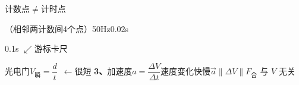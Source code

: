 计数点$\ne$计时点

（相邻两计数间4个点）\quad 50Hz\quad 0.02s

0.1s
$\swarrow$游标卡尺

光电门\quad $V_{\text{瞬}}=\dfrac{d}{t}$\ $\leftarrow$很短
\textbf{3、}加速度\quad $a=\dfrac{\Delta V}{\Delta t}$\quad 速度变化快慢\quad $\vec a\parallel\Delta V\parallel F_{\text{合}}$ 与 $V$ 无关
